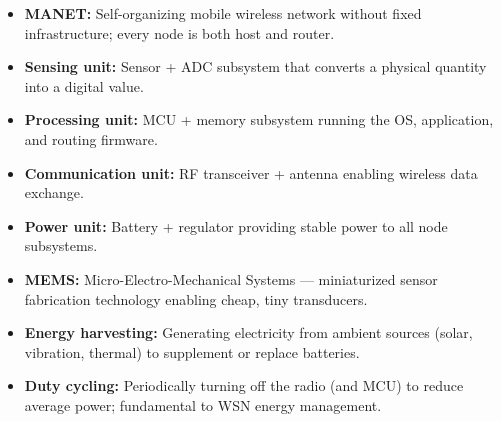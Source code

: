 \documentclass[12pt,a4paper]{article}
\begin{document}
\begin{tcolorbox}[defbox, title={\textbf{One-Line Definitions}}]
\begin{itemize}[leftmargin=*, itemsep=3pt]
  \item \textbf{MANET:} Self-organizing mobile wireless network without fixed infrastructure; every node is both host and router.
  \item \textbf{Sensing unit:} Sensor + ADC subsystem that converts a physical quantity into a digital value.
  \item \textbf{Processing unit:} MCU + memory subsystem running the OS, application, and routing firmware.
  \item \textbf{Communication unit:} RF transceiver + antenna enabling wireless data exchange.
  \item \textbf{Power unit:} Battery + regulator providing stable power to all node subsystems.
  \item \textbf{MEMS:} Micro-Electro-Mechanical Systems --- miniaturized sensor fabrication technology enabling cheap, tiny transducers.
  \item \textbf{Energy harvesting:} Generating electricity from ambient sources (solar, vibration, thermal) to supplement or replace batteries.
  \item \textbf{Duty cycling:} Periodically turning off the radio (and MCU) to reduce average power; fundamental to WSN energy management.
\end{itemize}
\end{tcolorbox}
\end{document}

